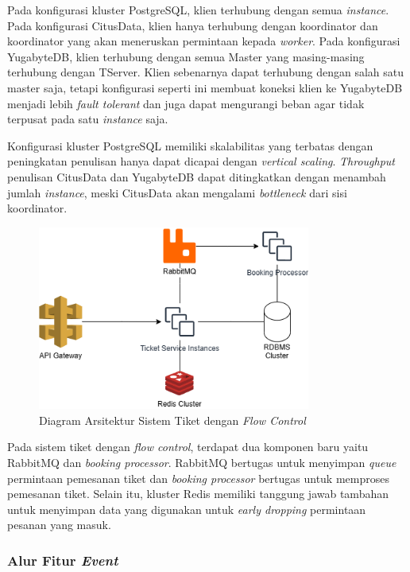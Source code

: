 Pada konfigurasi kluster PostgreSQL, klien terhubung dengan semua \textit{instance}. Pada konfigurasi CitusData, klien hanya terhubung dengan koordinator dan koordinator yang akan meneruskan permintaan kepada \textit{worker}. Pada konfigurasi YugabyteDB, klien terhubung dengan semua Master yang masing-masing terhubung dengan TServer. Klien sebenarnya dapat terhubung dengan salah satu master saja, tetapi konfigurasi seperti ini membuat koneksi klien ke YugabyteDB menjadi lebih \textit{fault tolerant} dan juga dapat mengurangi beban agar tidak terpusat pada satu \textit{instance} saja.

Konfigurasi kluster PostgreSQL memiliki skalabilitas yang terbatas dengan peningkatan penulisan hanya dapat dicapai dengan \textit{vertical scaling}. \textit{Throughput} penulisan CitusData dan YugabyteDB dapat ditingkatkan dengan menambah jumlah \textit{instance}, meski CitusData akan mengalami \textit{bottleneck} dari sisi koordinator.

\begin{figure}[htbp]
    \centering
    \includegraphics[width=0.8\textwidth]{resources/chapter-3/ticket-fc.png}
    \caption{Diagram Arsitektur Sistem Tiket dengan \textit{Flow Control}}
    \label{fig:ticket-fc}
\end{figure}

Pada sistem tiket dengan \textit{flow control}, terdapat dua komponen baru yaitu RabbitMQ dan \textit{booking processor}. RabbitMQ bertugas untuk menyimpan \textit{queue} permintaan pemesanan tiket dan \textit{booking processor} bertugas untuk memproses pemesanan tiket. Selain itu, kluster Redis memiliki tanggung jawab tambahan untuk menyimpan data yang digunakan untuk \textit{early dropping} permintaan pesanan yang masuk.

\pagebreak

\subsubsection{Alur Fitur \textit{Event}}


